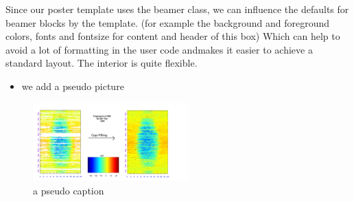 
Since our poster template uses the beamer class,
we can influence the defaults for beamer blocks by the template.
(for example the background and foreground colors, fonts and fontsize for content and header of this box)
Which can help to avoid a lot of formatting in the user code andmakes it easier to achieve a standard layout.
The interior is quite flexible.\\
\begin{itemize}
	\item we add a pseudo picture
\end{itemize}
	\begin{figure}[tb]
		\includegraphics[height=3cm]{images/content/DE-Tha_1998_FP_NEE_ffc.pdf}
    \caption{a pseudo caption}
	\end{figure}



